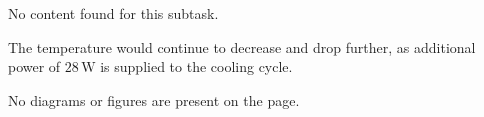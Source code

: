 No content found for this subtask.

The temperature would continue to decrease and drop further, as additional power of \( 28 \, \text{W} \) is supplied to the cooling cycle.  

No diagrams or figures are present on the page.